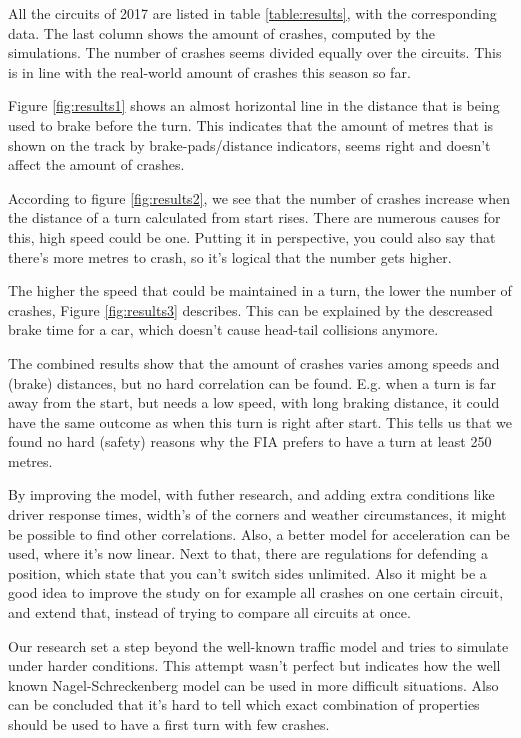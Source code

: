 All the circuits of 2017 are listed in table \ref{table:results}, with the corresponding data. The last column shows the amount of crashes, computed by the simulations. The number of crashes seems divided equally over the circuits. This is in line with the real-world amount of crashes this season so far.

Figure \ref{fig:results1} shows an almost horizontal line in the distance that is being used to brake before the turn. This indicates that the amount of metres that is shown on the track by brake-pads/distance indicators, seems right and doesn't affect the amount of crashes.

According to figure \ref{fig:results2}, we see that the number of crashes increase when the distance of a turn calculated from start rises. There are numerous causes for this, high speed could be one. Putting it in perspective, you could also say that there's more metres to crash, so it's logical that the number gets higher.

The higher the speed that could be maintained in a turn, the lower the number of crashes, Figure \ref{fig:results3} describes. This can be explained by the descreased brake time for a car, which doesn't cause head-tail collisions anymore.

The combined results show that the amount of crashes varies among speeds and (brake) distances, but no hard correlation can be found. E.g. when a turn is far away from the start, but needs a low speed, with long braking distance, it could have the same outcome as when this turn is right after start. This tells us that we found no hard (safety) reasons why the FIA prefers to have a turn at least 250 metres.

By improving the model, with futher research, and adding extra conditions like driver response times, width's of the corners and weather circumstances, it might be possible to find other correlations. Also, a better model for acceleration can be used, where it's now linear. Next to that, there are regulations for defending a position, which state that you can't switch sides unlimited. Also it might be a good idea to improve the study on for example all crashes on one certain circuit, and extend that, instead of trying to compare all circuits at once.

Our research set a step beyond the well-known traffic model and tries to simulate under harder conditions. This attempt wasn't perfect but indicates how the well known Nagel-Schreckenberg model can be used in more difficult situations. Also can be concluded that it's hard to tell which exact combination of properties should be used to have a first turn with few crashes.
